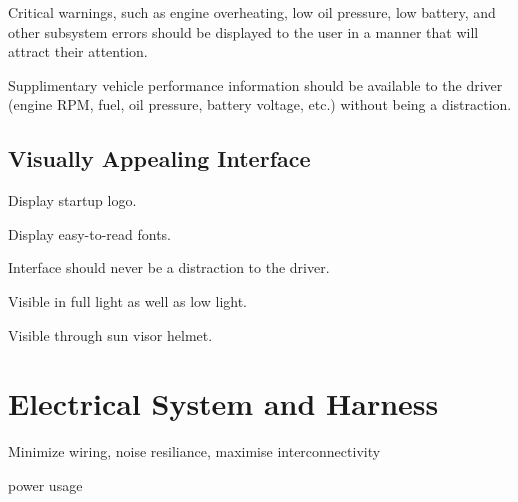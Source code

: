 Critical warnings, such as engine overheating, low oil pressure, low battery, and other subsystem errors should be displayed to the user in a manner that will attract their attention.

Supplimentary vehicle performance information should be available to the driver (engine RPM, fuel, oil pressure, battery voltage, etc.) without being a distraction.


\subsection{Visually Appealing Interface}

Display startup logo.

Display easy-to-read fonts.

Interface should never be a distraction to the driver.

Visible in full light as well as low light.

Visible through sun visor helmet.


\section{Electrical System and Harness}

Minimize wiring, noise resiliance, maximise interconnectivity

power usage